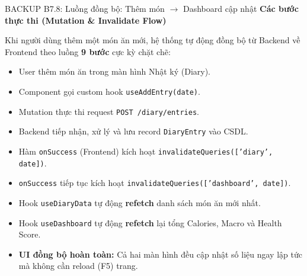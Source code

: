 \documentclass[10pt, aspectratio=169]{beamer}
\begin{document}
\begin{frame}[fragile, label=b7_8]{BACKUP B7.8: Luồng đồng bộ: Thêm món $\rightarrow$ Dashboard cập nhật}
\hypertarget{b7_8_target}{}
    \textbf{Các bước thực thi (Mutation \& Invalidate Flow)}
    \vspace{0.1cm}
    
    Khi người dùng thêm một món ăn mới, hệ thống tự động đồng bộ từ Backend về Frontend theo luồng \textbf{9 bước} cực kỳ chặt chẽ:
    
    \begin{itemize}
        \small \setlength{\itemsep}{2pt}
        \item[\textbf{1.}] User thêm món ăn trong màn hình Nhật ký (Diary).
        \item[\textbf{2.}] Component gọi custom hook \texttt{useAddEntry(date)}.
        \item[\textbf{3.}] Mutation thực thi request \texttt{POST /diary/entries}.
        \item[\textbf{4.}] Backend tiếp nhận, xử lý và lưu record \texttt{DiaryEntry} vào CSDL.
        \item[\textbf{5.}] Hàm \texttt{onSuccess} (Frontend) kích hoạt \texttt{invalidateQueries(['diary', date])}.
        \item[\textbf{6.}] \texttt{onSuccess} tiếp tục kích hoạt \texttt{invalidateQueries(['dashboard', date])}.
        \item[\textbf{7.}] Hook \texttt{useDiaryData} tự động \textbf{refetch} danh sách món ăn mới nhất.
        \item[\textbf{8.}] Hook \texttt{useDashboard} tự động \textbf{refetch} lại tổng Calories, Macro và Health Score.
        \item[\textbf{9.}] \textbf{UI đồng bộ hoàn toàn:} Cả hai màn hình đều cập nhật số liệu ngay lập tức mà không cần reload (F5) trang.
    \end{itemize}
\end{frame}
\end{document}
